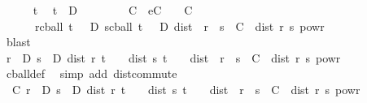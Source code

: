 \begin{isabellebody}
\isanewline
\ \ \ \ \isamarkupfalse%
\ t\ \isamarkupfalse%
\ {\isachardoublequoteopen}t\ {\isasymin}\ D{\isachardoublequoteclose}\isanewline
\ \ \ \ \isamarkupfalse%
\ \isamarkupfalse%
\ {\isasymepsilon}\ C\ \ eC{\isacharcolon}{\kern0pt}\ {\isachardoublequoteopen}{\isasymepsilon}\ {\isachargreater}{\kern0pt}\ {}{\isachardoublequoteclose}\ {\isachardoublequoteopen}C\ {\isasymge}\ {}{\isachardoublequoteclose}\isanewline
\ \ \ \ \ \ {\isachardoublequoteopen}{\isasymforall}r{\isasymin}cball\ t\ {\isasymepsilon}\ {\isasyminter}\ D{\isachardot}{\kern0pt}\ {\isasymforall}s{\isasymin}cball\ t\ {\isasymepsilon}\ {\isasyminter}\ D{\isachardot}{\kern0pt}\ dist\ {\isacharparenleft}{\kern0pt}{\isasymphi}\ r{\isacharparenright}{\kern0pt}\ {\isacharparenleft}{\kern0pt}{\isasymphi}\ s{\isacharparenright}{\kern0pt}\ {\isasymle}\ C\ {\isacharasterisk}{\kern0pt}\ dist\ r\ s\ powr\ {\isasymgamma}{\isachardoublequoteclose}\isanewline
\ \ \ \ \ \ \isamarkupfalse%
\ {\isacharasterisk}{\kern0pt}\ \isamarkupfalse%
\ blast\isanewline
\ \ \ \ \isamarkupfalse%
\ \isamarkupfalse%
\ {\isachardoublequoteopen}{\isasymforall}r\ {\isasymin}\ D{\isachardot}{\kern0pt}\ {\isasymforall}s\ {\isasymin}\ D{\isachardot}{\kern0pt}\ dist\ r\ t\ {\isacharless}{\kern0pt}\ {\isasymepsilon}\ {\isasymand}\ dist\ s\ t\ {\isacharless}{\kern0pt}\ {\isasymepsilon}\ {\isasymlongrightarrow}\ dist\ {\isacharparenleft}{\kern0pt}{\isasymphi}\ r{\isacharparenright}{\kern0pt}\ {\isacharparenleft}{\kern0pt}{\isasymphi}\ s{\isacharparenright}{\kern0pt}\ {\isasymle}\ C\ {\isacharasterisk}{\kern0pt}\ dist\ r\ s\ powr\ {\isasymgamma}{\isachardoublequoteclose}\isanewline
\ \ \ \ \ \ \isamarkupfalse%
\ cball{\isacharunderscore}{\kern0pt}def\ \isamarkupfalse%
\ {\isacharparenleft}{\kern0pt}simp\ add{\isacharcolon}{\kern0pt}\ dist{\isacharunderscore}{\kern0pt}commute{\isacharparenright}{\kern0pt}\isanewline
\ \ \ \ \isamarkupfalse%
\ \isamarkupfalse%
\ {\isachardoublequoteopen}{\isasymexists}{\isasymepsilon}{\isachargreater}{\kern0pt}{}{\isachardot}{\kern0pt}\ {\isasymexists}C{\isasymge}{}{\isachardot}{\kern0pt}\ {\isasymforall}r\ {\isasymin}\ D{\isachardot}{\kern0pt}\ {\isasymforall}s\ {\isasymin}\ D{\isachardot}{\kern0pt}\ dist\ r\ t\ {\isacharless}{\kern0pt}\ {\isasymepsilon}\ {\isasymand}\ dist\ s\ t\ {\isacharless}{\kern0pt}\ {\isasymepsilon}\ {\isasymlongrightarrow}\ dist\ {\isacharparenleft}{\kern0pt}{\isasymphi}\ r{\isacharparenright}{\kern0pt}\ {\isacharparenleft}{\kern0pt}{\isasymphi}\ s{\isacharparenright}{\kern0pt}\ {\isasymle}\ C\ {\isacharasterisk}{\kern0pt}\ dist\ r\ s\ powr\ {\isasymgamma}{\isachardoublequoteclose}\isanewline

\end{isabellebody}
